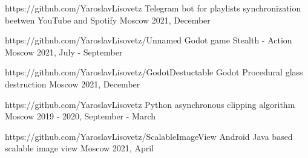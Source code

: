 


\vspace{0cm}\begin{cventries}
	
	\cventry
	{https://github.com/YaroslavLisovetz} %
	{Telegram bot for playlists synchronization beetwen YouTube and Spotify } %
	{Moscow} %
	{2021, December} %
	{}
	
	\cventry
	{https://github.com/YaroslavLisovetz/Unnamed} %
	{Godot game Stealth - Action} %
	{Moscow} %
	{2021, July - September} %
	{}
	
	\cventry
	{https://github.com/YaroslavLisovetz/GodotDestuctable} %
	{Godot Procedural glass destruction} %
	{Moscow} %
	{2021, December} %
	{}
	
	
	\cventry
	{https://github.com/YaroslavLisovetz} %
	{Python asynchronous clipping algorithm} %
	{Moscow} %
	{2019 - 2020, September - March} %
	{}
	
	\cventry
	{https://github.com/YaroslavLisovetz/ScalableImageView} %
	{Android Java based scalable image view} %
	{Moscow} %
	{2021, April} %
	{}
	
	
	
	
	
	

\end{cventries}
